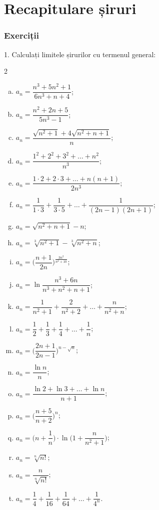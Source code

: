 \chapter{Recapitulare șiruri}


\subsection*{Exerciții}
 

1. Calculați limitele șirurilor cu termenul general:
\begin{multicols}{2}
  \begin{enumerate}[(a)]
  \item $ a_n = \dfrac{n^3 + 5n^2 + 1}{6n^3 + n + 4} $;
  \item $ a_n = \dfrac{n^2 + 2n + 5}{5n^3 - 1} $;
  \item $ a_n = \dfrac{\sqrt{n^2 + 1} + 4\sqrt{n^2 + n + 1}}{n} $;
  \item $ a_n = \dfrac{1^2 + 2^2 + 3^2 + \dots + n^2}{n^3} $;
  \item $ a_n = \dfrac{1 \cdot 2 + 2 \cdot 3 + \dots + n(n+1)}{2n^3} $;
  \item $ a_n = \dfrac{1}{1 \cdot 3} + \dfrac{1}{3 \cdot 5} + \dots + \dfrac{1}{(2n-1)(2n+1)} $;
  \item $ a_n = \sqrt{n^2 + n + 1} - n $;
  \item $ a_n = \sqrt[3]{n^2 + 1} - \sqrt[3]{n^2 + n} $;
  \item $ a_n = \Big( \dfrac{n+1}{2n} \Big)^{\frac{3n^2}{n^2 + 10}} $;
  \item $ a_n = \ln \dfrac{n^3 + 6n}{n^3 + n^2 + n + 1} $;
  \item $ a_n = \dfrac{1}{n^2 + 1} + \dfrac{2}{n^2 + 2} + \dots + \dfrac{n}{n^2 + n} $;
  \item $ a_n = \dfrac{1}{2} + \dfrac{1}{3} + \dfrac{1}{4} + \dots + \dfrac{1}{n} $;
  \item $ a_n = \Big( \dfrac{2n + 1}{2n - 1} \Big)^{n - \sqrt{n}} $;
  \item $ a_n = \dfrac{\ln n}{n} $;
  \item $ a_n = \dfrac{\ln 2 + \ln 3 + \dots + \ln n}{n + 1} $;
  \item $ a_n = \Big( \dfrac{n + 5}{n + 2} \Big)^n $;
  \item $ a_n = \Big( n + \dfrac{1}{n} \Big) \cdot \ln \Big( 1 + \dfrac{n}{n^2 + 1} \Big) $;
  \item $ a_n = \sqrt[n]{n!} $;
  \item $ a_n = \dfrac{n}{\sqrt[n]{n!}} $;
  \item $ a_n = \dfrac{1}{4} + \dfrac{1}{16} + \dfrac{1}{64} + \dots + \dfrac{1}{4^n} $.
  \end{enumerate}
\end{multicols}

